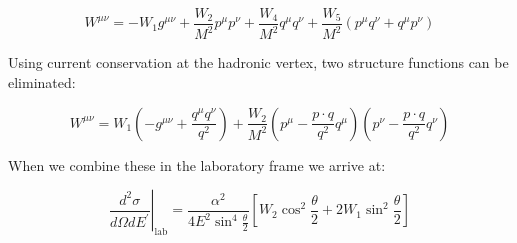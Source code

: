 \begin{equation}
	W^{\mu\nu} = -W_{1}g^{\mu\nu} + \frac{W_2}{M^2}p^{\mu}p^{\nu} + \frac{W_4}{M^2}q^{\mu}q^{\nu} + \frac{W_5}{M^2}\left(p^{\mu}q^{\nu} + q^{\mu}p^{\nu}\right)
\end{equation}

Using current conservation at the hadronic vertex, two structure functions can be eliminated:

\begin{equation}
	W^{\mu\nu} = W_{1}\left(-g^{\mu\nu} + \frac{q^{\mu}q^{\nu}}{q^2}\right) + \frac{W_2}{M^2}\left(p^{\mu}-\frac{p\cdot q}{q^2}q^{\mu}\right)\left(p^{\nu}-\frac{p\cdot q}{q^2}q^{\nu}\right)
\end{equation}

When we combine these in the laboratory frame we arrive at:

\begin{equation}
	\left.\frac{d^2\sigma}{d\Omega dE^\prime}\right\rvert_{\mathrm{lab}} = \frac{\alpha^2}{4E^{2}\sin^{4}\frac{\theta}{2}} \left[W_{2}\cos^{2}\frac{\theta}{2} + 2W_{1}\sin^{2}\frac{\theta}{2}\right]
	\label{xs_inelastic}
\end{equation}


